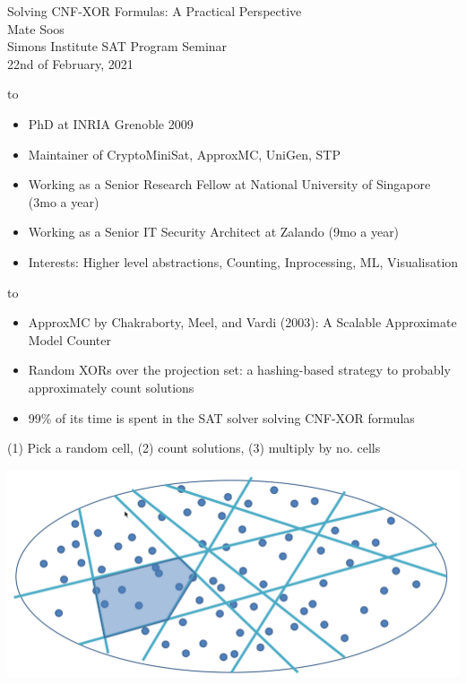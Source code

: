 \documentclass[aspectratio=196]{slides}
\def\TITLE#1{\hbox to \linewidth{\large #1\hfill}}
\def\BOTTOM{\vfill\newpage}
\def\SLIDE#1{\BOTTOM\TITLE{#1}}
\begin{document}
\begin{center}
{\huge Solving CNF-XOR Formulas: A Practical Perspective} \\[1cm]
{\Large Mate Soos}\\[1cm]

{\large Simons Institute SAT Program Seminar}
\\[2ex]
22nd of February, 2021 \\[16ex]

\end{center}
\newpage
\SLIDE{About Me}
\begin{itemize}
\item PhD at INRIA Grenoble 2009
\item Maintainer of CryptoMiniSat, ApproxMC, UniGen, STP
\item Working as a Senior Research Fellow at National University of Singapore (3mo a year)
\item Working as a Senior IT Security Architect at Zalando (9mo a year)
\item Interests: Higher level abstractions, Counting, Inprocessing, ML, Visualisation
\end{itemize}
\vfill
\newpage
\SLIDE{Motivating Problem: Approximate Counting}

\begin{itemize}
\item ApproxMC by Chakraborty, Meel, and Vardi (2003): A Scalable Approximate Model Counter
\item Random XORs over the projection set: a hashing-based strategy to probably approximately count solutions
\item 99\% of its time is spent in the SAT solver solving CNF-XOR formulas
\end{itemize}

(1) Pick a random cell, (2) count solutions, (3) multiply by no. cells
\begin{center}
\includegraphics[width=24cm]{cuts_on_plane.png}
\end{center}
\end{document}
